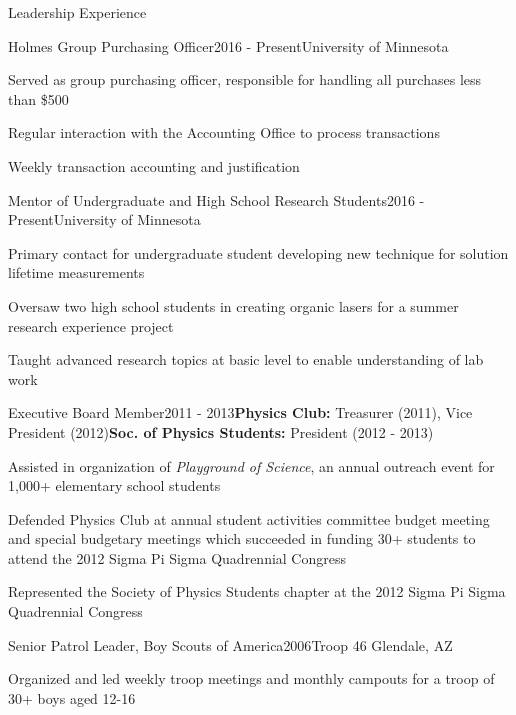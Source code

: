 \documentclass{resume} %
\begin{document}
\begin{rSection}{Leadership Experience}

\begin{rSubsection}{Holmes Group Purchasing Officer}{2016 - Present}{University of Minnesota}{}
\item Served as group purchasing officer, responsible for handling all purchases less than \$500
\item Regular interaction with the Accounting Office to process transactions
\item Weekly transaction accounting and justification
\end{rSubsection}

\begin{rSubsection}{Mentor of Undergraduate and High School Research Students}{2016 - Present}{University of Minnesota}{}
\item Primary contact for undergraduate student developing new technique for solution lifetime measurements
\item Oversaw two high school students in creating organic lasers for a summer research experience project
\item Taught advanced research topics at basic level to enable understanding of lab work
\end{rSubsection}

\begin{rSubsection}{Executive Board Member}{2011 - 2013}{\textbf{Physics Club:} Treasurer (2011), Vice President (2012)}{\textbf{Soc. of Physics Students:} President (2012 - 2013)}
\item Assisted in organization of {\em Playground of Science}, an annual outreach event for 1,000+ elementary school students
\item Defended Physics Club at annual student activities committee budget meeting and special budgetary meetings which succeeded in funding 30+ students to attend the 2012 Sigma Pi Sigma Quadrennial Congress
\item Represented the Society of Physics Students chapter at the 2012 Sigma Pi Sigma Quadrennial Congress
\end{rSubsection}

\begin{rSubsection}{Senior Patrol Leader, Boy Scouts of America}{2006}{Troop 46 Glendale, AZ}{}
\item Organized and led weekly troop meetings and monthly campouts for a troop of 30+ boys aged 12-16
\end{rSubsection}

\end{rSection}
\end{document}
